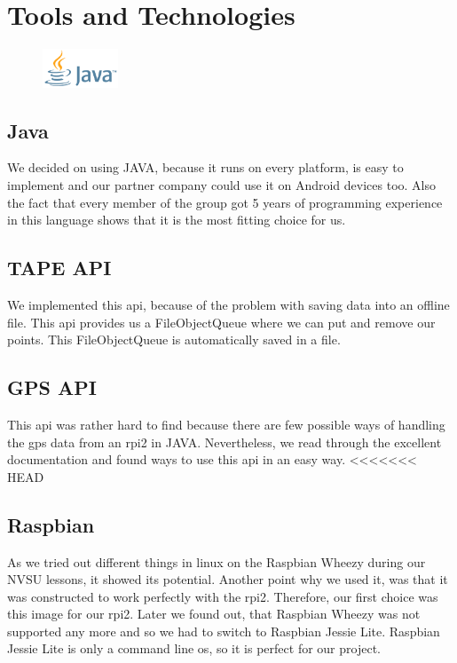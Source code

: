 \chapter{Tools and Technologies}
\begin{figure}
  \begin{center}
    \includegraphics[width=0.2\textwidth] {bilder/java}
  \end{center}
\end{figure}
\section{Java}
We decided on using JAVA, because it runs on every platform, is easy to implement and our partner company could use it on Android devices too. Also the fact that every member of the group got 5 years of programming experience in this language shows that it is the most fitting choice for us.
\section{TAPE API}
We implemented this \gls{api}, because of the problem with saving data into an offline file. This \gls{api} provides us a FileObjectQueue where we can put and remove our points. This FileObjectQueue is automatically saved in a file.
\section{GPS API}
This \gls{api} was rather hard to find because there are few possible ways of handling the \gls{gps} data from an \gls{rpi2} in JAVA. Nevertheless, we read through the excellent documentation and found ways to use this \gls{api} in an easy way.
<<<<<<< HEAD
\section{Raspbian}
As we tried out different things in linux on the Raspbian Wheezy during our NVSU lessons, it showed its potential. Another point why we used it, was that it was constructed to work perfectly with the \gls{rpi2}. Therefore, our first choice was this image for our \gls{rpi2}. Later we found out, that Raspbian Wheezy was not supported any more and so we had to switch to Raspbian Jessie Lite. Raspbian Jessie Lite is only a command line \gls{os}, so it is perfect for our project.
